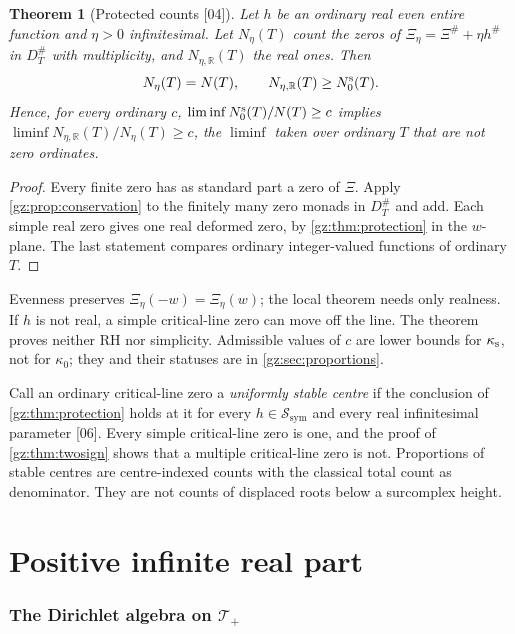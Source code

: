 \documentclass[11pt,a4paper]{article}
\numberwithin{equation}{section}
\newtheorem{theorem}{Theorem}[section]
\theoremstyle{definition}
\theoremstyle{remark}
\newcommand{\R}{\mathbb R}
\newcommand{\Tp}{\mathcal T_{+}}
\newcommand{\Ssym}{\mathcal S_{\mathrm{sym}}}
\newcommand{\src}[1]{\textup{[#1]}}
\begin{document}
\begin{theorem}[Protected counts \src{04}]\label{gz:thm:protected}
Let $h$ be an ordinary real even entire function and $\eta>0$ infinitesimal.
Let $N_\eta(T)$ count the zeros of $\Xi_\eta=\Xi^\#+\eta h^\#$ in $D_T^\#$
with multiplicity, and $N_{\eta,\R}(T)$ the real ones. Then
\[
N_\eta(T)=N(T),\qquad N_{\eta,\R}(T)\ge N_0^{\rm s}(T).
\]
Hence, for every ordinary $c$, $\liminf N_0^{\rm s}(T)/N(T)\ge c$ implies
$\liminf N_{\eta,\R}(T)/N_\eta(T)\ge c$, the $\liminf$ taken over ordinary
$T$ that are not zero ordinates.
\end{theorem}
\begin{proof}
Every finite zero has as standard part a zero of $\Xi$. Apply
\cref{gz:prop:conservation} to the finitely many zero monads in $D_T^\#$
and add. Each simple real zero gives one real deformed zero, by
\cref{gz:thm:protection} in the $w$-plane. The last statement compares
ordinary integer-valued functions of ordinary $T$.
\end{proof}
Evenness preserves $\Xi_\eta(-w)=\Xi_\eta(w)$; the local theorem needs only
realness. If $h$ is not real, a simple critical-line zero can move off the
line. The theorem proves neither RH nor simplicity. Admissible values of
$c$ are lower bounds for $\kappa_{\rm s}$, not for $\kappa_0$; they and
their statuses are in \cref{gz:sec:proportions}.

Call an ordinary critical-line zero a \emph{uniformly stable centre} if the
conclusion of \cref{gz:thm:protection} holds at it for every $h\in\Ssym$ and
every real infinitesimal parameter \src{06}. Every simple critical-line zero
is one, and the proof of \cref{gz:thm:twosign} shows that a multiple
critical-line zero is not. Proportions of stable centres are centre-indexed
counts with the classical total count as denominator. They are not counts of
displaced roots below a surcomplex height.

\part{Positive infinite real part}\label{gz:part:right}

\section{The Dirichlet algebra on \texorpdfstring{$\Tp$}{T+}}\label{gz:sec:dirichlet}
\end{document}
